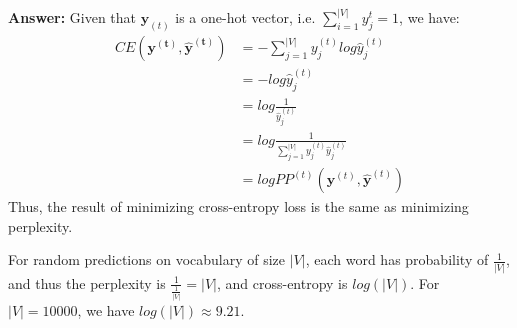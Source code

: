 \documentclass[11pt]{article}
\begin{document}
\textbf{Answer:}
Given that $\mathbf{y}_{(t)}$ is a one-hot vector, i.e. $\sum_{i=1}^{|V|}y^{t}_{j} = 1$, we have:
\begin{equation*}
  \begin{split}
    CE(\mathbf{y^{(t)}}, \mathbf{\hat{y}^{(t)}})
    &= - \sum_{j=1}^{|V|}{ y_{j}^{(t)} log\hat{y}_{j}^{(t)} } \\
    &= - log\hat{y}_{j}^{(t)} \\
    &= log \frac{ 1 }{ \hat{y}_{j}^{(t)} } \\
    &= log \frac{ 1 }{ \sum_{j=1}^{|V|}{ y_{j}^{(t)} \hat{y}_{j}^{(t)} } } \\
    &= log PP^{(t)}(\mathbf{y}^{(t)}, \mathbf{\hat{y}}^{(t)})
  \end{split}
\end{equation*}
Thus, the result of minimizing cross-entropy loss is the same as minimizing perplexity.

For random predictions on vocabulary of size $|V|$, each word has probability of $\frac{1}{|V|}$, and thus the perplexity is $\frac{1}{\frac{1}{|V|}} = |V|$, and cross-entropy is $log(|V|)$. For $|V| = 10000$, we have $log(|V|) \approx 9.21$.
\end{document}

